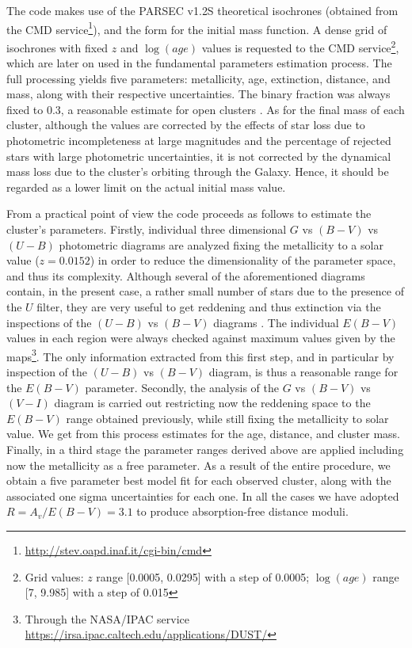 \documentclass[draft]{aa}
\begin{document}
The code makes use of the PARSEC v1.2S \citep{Bressan_2012} theoretical
isochrones (obtained from the CMD
service\footnote{\url{http://stev.oapd.inaf.it/cgi-bin/cmd}}), and the
\cite{Kroupa_2002} form for the initial mass function. A dense grid of
isochrones with fixed $z$ and $\log(age)$ values is requested to the CMD
service\footnote{Grid values: $z$ range [0.0005, 0.0295] with a step of
0.0005; $\log(age)$ range [7, 9.985] with a step of 0.015}, which are later on
used in the fundamental parameters estimation
process. The full processing yields five parameters: metallicity, age,
extinction, distance, and mass, along with their respective uncertainties. The
binary fraction was always fixed to 0.3, a reasonable
estimate for open clusters \citep{Sollima_2010}. As for the final mass of each
cluster, although the values are corrected by the effects of star loss
due to photometric incompleteness at large magnitudes and the
percentage of rejected stars with large photometric uncertainties, it is not
corrected by the dynamical mass loss due to the cluster's orbiting through the
Galaxy. Hence, it should be regarded as a lower limit on the actual initial
mass value.

From a practical point of view the code proceeds as follows to estimate the
cluster's parameters. Firstly, individual three dimensional $G$ vs $(B-V)$ vs $
(U-B)$ photometric diagrams are analyzed fixing the metallicity to a solar
value ($z = 0.0152$) in order to reduce the dimensionality of the parameter
space, and thus its complexity. Although several of the aforementioned diagrams
contain, in the present case, a rather small number of stars due to the
presence of the $U$ filter, they are very useful to get reddening and thus
extinction via the inspections of the $(U-B)$ vs $(B-V)$ diagrams
\citep[e.g.,][]{Vazquez2008} .
The individual $E(B-V)$ values in each region were always checked against
maximum values given by the \cite{Schlafly_2011} maps\footnote{Through the
NASA/IPAC service \url{https://irsa.ipac.caltech.edu/applications/DUST/}}.
The only information extracted from this first step, and in particular
by inspection of the $(U-B)$ vs $(B-V)$ diagram, is thus a reasonable range for
the $E(B-V)$ parameter.
%
Secondly, the analysis of the $G$ vs $(B-V)$ vs $(V-I)$ diagram is carried out
restricting now the reddening space to the $E(B-V)$ range obtained previously,
while still fixing the metallicity to solar value. We get from this process
estimates for the age, distance, and cluster mass.
%
Finally, in a third stage the parameter ranges derived above are applied
including now the metallicity as a free parameter.
As a result of the entire procedure, we obtain a five parameter best model fit
for each observed cluster, along with the associated one sigma uncertainties
for each one. In all the cases we have adopted $R=A_v/E(B-V) = 3.1$ to produce 
absorption-free distance moduli.
\end{document}

